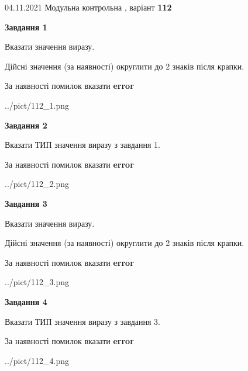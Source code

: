 \documentclass[11pt, ukrainian]{article}
\begin{document}
{04.11.2021 Модульна контрольна , варіант  \No \textbf { 112 }\par}
{
\begin {large}
{\begin {center}\textbf{Завдання 1}\end {center}}\par
Вказати значення виразу. \par
Дійсні значення (за наявності) округлити до 2 знаків після крапки. \par
За наявності помилок вказати \textbf{error}

\begin{center}
	{../pict/112_1.png}
\end{center}
\newpage

{\begin {center}\textbf{Завдання 2}\end {center}}\par
Вказати ТИП значення виразу з завдання 1. \par
За наявності помилок вказати \textbf{error}

\begin{center}
	{../pict/112_2.png}
\end{center}
\newpage

{\begin {center}\textbf{Завдання 3}\end {center}}\par
Вказати значення виразу. \par
Дійсні значення (за наявності) округлити до 2 знаків після крапки. \par
За наявності помилок вказати \textbf{error}

\begin{center}
	{../pict/112_3.png}
\end{center}
\newpage

{\begin {center}\textbf{Завдання 4}\end {center}}\par
Вказати ТИП значення виразу з завдання 3. \par
За наявності помилок вказати \textbf{error}

\begin{center}
	{../pict/112_4.png}
\end{center}
\newpage


\end{large}}
\end{document}
